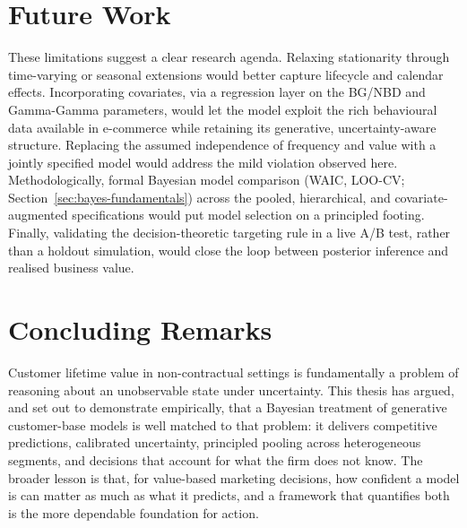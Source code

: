 \section{Future Work}
\label{sec:future}

These limitations suggest a clear research agenda. Relaxing stationarity through time-varying or seasonal extensions would better capture lifecycle and calendar effects. Incorporating covariates, via a regression layer on the BG/NBD and Gamma-Gamma parameters, would let the model exploit the rich behavioural data available in e-commerce while retaining its generative, uncertainty-aware structure. Replacing the assumed independence of frequency and value with a jointly specified model would address the mild violation observed here. Methodologically, formal Bayesian model comparison (WAIC, LOO-CV; Section~\ref{sec:bayes-fundamentals}) across the pooled, hierarchical, and covariate-augmented specifications would put model selection on a principled footing. Finally, validating the decision-theoretic targeting rule in a live A/B test, rather than a holdout simulation, would close the loop between posterior inference and realised business value.

\section{Concluding Remarks}
\label{sec:concluding}

Customer lifetime value in non-contractual settings is fundamentally a problem of reasoning about an unobservable state under uncertainty. This thesis has argued, and set out to demonstrate empirically, that a Bayesian treatment of generative customer-base models is well matched to that problem: it delivers competitive predictions, calibrated uncertainty, principled pooling across heterogeneous segments, and decisions that account for what the firm does not know. The broader lesson is that, for value-based marketing decisions, how confident a model is can matter as much as what it predicts, and a framework that quantifies both is the more dependable foundation for action.
